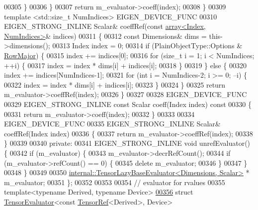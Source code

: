 \begin{DoxyCode}
00305         \}
00306       \}
00307       \textcolor{keywordflow}{return} m\_evaluator->coeff(index);
00308     \}
00309     \textcolor{keyword}{template} <std::\textcolor{keywordtype}{size\_t} NumIndices> EIGEN\_DEVICE\_FUNC
00310     EIGEN\_STRONG\_INLINE Scalar& coeffRef(\textcolor{keyword}{const} \hyperlink{class_eigen_1_1array}{array<Index, NumIndices>}& indices)
00311     \{
00312       \textcolor{keyword}{const} Dimensions& dims = this->dimensions();
00313       Index index = 0;
00314       \textcolor{keywordflow}{if} (PlainObjectType::Options & \hyperlink{group__enums_ggaacded1a18ae58b0f554751f6cdf9eb13acfcde9cd8677c5f7caf6bd603666aae3}{RowMajor}) \{
00315         index += indices[0];
00316         \textcolor{keywordflow}{for} (\textcolor{keywordtype}{size\_t} i = 1; i < NumIndices; ++i) \{
00317           index = index * dims[i] + indices[i];
00318         \}
00319       \} \textcolor{keywordflow}{else} \{
00320         index += indices[NumIndices-1];
00321         \textcolor{keywordflow}{for} (\textcolor{keywordtype}{int} i = NumIndices-2; i >= 0; --i) \{
00322           index = index * dims[i] + indices[i];
00323         \}
00324       \}
00325       \textcolor{keywordflow}{return} m\_evaluator->coeffRef(index);
00326     \}
00327 
00328     EIGEN\_DEVICE\_FUNC
00329     EIGEN\_STRONG\_INLINE \textcolor{keyword}{const} Scalar coeff(Index index)\textcolor{keyword}{ const}
00330 \textcolor{keyword}{    }\{
00331       \textcolor{keywordflow}{return} m\_evaluator->coeff(index);
00332     \}
00333 
00334     EIGEN\_DEVICE\_FUNC
00335     EIGEN\_STRONG\_INLINE Scalar& coeffRef(Index index)
00336     \{
00337       \textcolor{keywordflow}{return} m\_evaluator->coeffRef(index);
00338     \}
00339 
00340   \textcolor{keyword}{private}:
00341     EIGEN\_STRONG\_INLINE \textcolor{keywordtype}{void} unrefEvaluator() \{
00342       \textcolor{keywordflow}{if} (m\_evaluator) \{
00343         m\_evaluator->decrRefCount();
00344         \textcolor{keywordflow}{if} (m\_evaluator->refCount() == 0) \{
00345           \textcolor{keyword}{delete} m\_evaluator;
00346         \}
00347       \}
00348     \}
00349 
00350   \hyperlink{class_eigen_1_1internal_1_1_tensor_lazy_base_evaluator}{internal::TensorLazyBaseEvaluator<Dimensions, Scalar>}
      * m\_evaluator;
00351 \};
00352 
00353 
00354 \textcolor{comment}{// evaluator for rvalues}
00355 \textcolor{keyword}{template}<\textcolor{keyword}{typename} Derived, \textcolor{keyword}{typename} Device>
\hyperlink{struct_eigen_1_1_tensor_evaluator_3_01const_01_tensor_ref_3_01_derived_01_4_00_01_device_01_4}{00356} \textcolor{keyword}{struct }\hyperlink{struct_eigen_1_1_tensor_evaluator}{TensorEvaluator}<const \hyperlink{class_eigen_1_1_tensor_ref}{TensorRef}<Derived>, Device>

\end{DoxyCode}
